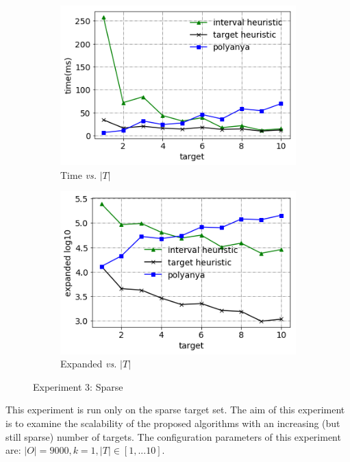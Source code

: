 \begin{figure}[!htbp]
    \centering
    \begin{subfigure}[htbp]{0.5\textwidth}
        \centering
        \includegraphics[width=.7\textwidth]{pic/e3_time.png}
        \caption{Time \textit{vs.} $|T|$}
        \label{e3_time}
    \end{subfigure}%
    \hfill
    \begin{subfigure}[htbp]{0.5\textwidth}
        \centering
        \includegraphics[width=.7\textwidth]{pic/e3_gen.png}
        \caption{Expanded \textit{vs.} $|T|$}
        \label{e3_gen}
    \end{subfigure}
    \caption{Experiment 3: Sparse}
\end{figure}

This experiment is run only on the sparse target set. The aim of this experiment is to examine the scalability of the proposed algorithms with an increasing
(but still sparse) number of targets. The configuration parameters of this experiment are: $|O|=9000,k=1,|T| \in [1,...10]$. 


